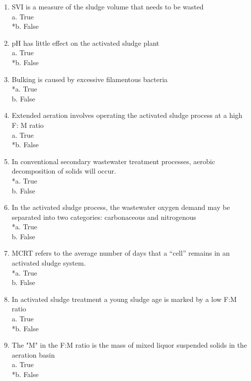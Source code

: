 \begin{enumerate}
\item  SVI is a measure of the sludge volume that needs to be wasted \\
a. True \\
*b. False \\

\item  pH has little effect on the activated sludge plant \\
a. True \\
*b. False \\

\item  Bulking is caused by excessive filamentous bacteria \\
*a. True \\
b. False \\


\item  Extended aeration involves operating the activated sludge process at a high F: M ratio \\
a. True \\
*b. False \\

\item  In conventional secondary wastewater treatment processes, aerobic decomposition of solids will occur. \\
*a. True \\
b. False \\

\item  In the activated sludge process, the wastewater oxygen demand may be separated into two categories:  carbonaceous and nitrogenous \\
*a. True \\
b. False \\

\item  MCRT refers to the average number of days that a “cell” remains in an activated sludge system. \\
*a. True \\
b. False \\

\item  In activated sludge treatment a young sludge age is marked by a low F:M ratio \\
a. True \\
*b. False \\

\item  The "M" in the F:M ratio is the mass of mixed liquor suspended solids in the aeration basin \\
a. True \\
*b. False \\


\end{enumerate}
